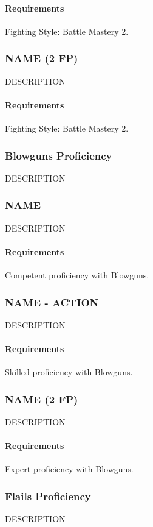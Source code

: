     \paragraph{Requirements} Fighting Style: Battle Mastery 2.
\subsubsection{NAME (2 FP)} \label{feat::name}
    DESCRIPTION
    \paragraph{Requirements} Fighting Style: Battle Mastery 2.

\subsubsection{Blowguns Proficiency} \label{feat::name}
    DESCRIPTION
\subsubsection{NAME} \label{feat::name}
    DESCRIPTION
    \paragraph{Requirements} Competent proficiency with Blowguns.
\subsubsection{NAME - ACTION} \label{feat::name}
    DESCRIPTION
    \paragraph{Requirements} Skilled proficiency with Blowguns.
\subsubsection{NAME (2 FP)} \label{feat::name}
    DESCRIPTION
    \paragraph{Requirements} Expert proficiency with Blowguns.
\subsubsection{Flails Proficiency} \label{feat::name}
    DESCRIPTION

